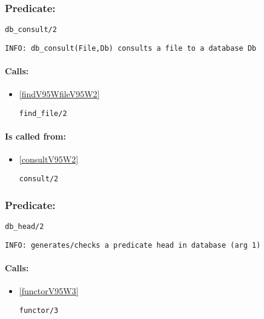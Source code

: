 \subsubsection{Predicate:} \label{dbV95WconsultV95W2}

\begin{verbatim}
db_consult/2
\end{verbatim}

{\small \begin{verbatim}
INFO: db_consult(File,Db) consults a file to a database Db

\end{verbatim}}
\paragraph{Calls:} 
\begin{itemize}
\item \ref{findV95WfileV95W2} 
\begin{verbatim}
find_file/2
\end{verbatim}

\end{itemize}
\paragraph{Is called from:} 
\begin{itemize}
\item \ref{consultV95W2} 
\begin{verbatim}
consult/2
\end{verbatim}

\end{itemize}

\subsubsection{Predicate:} \label{dbV95WheadV95W2}

\begin{verbatim}
db_head/2
\end{verbatim}

{\small \begin{verbatim}
INFO: generates/checks a predicate head in database (arg 1)

\end{verbatim}}
\paragraph{Calls:} 
\begin{itemize}
\item \ref{functorV95W3} 
\begin{verbatim}
functor/3
\end{verbatim}

\end{itemize}
